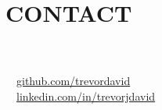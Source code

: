 \section{\large CONTACT}
\faPhone\ \ \textnormal{\myPhone} \\
\faEnvelope\ \ \href{mailto:\myEmail}{\myEmail} \\
\faGithub\ \ \href{https://github.com/trevordavid}{github.com/trevordavid} \\
\faLinkedin\ \ \href{https://www.linkedin.com/in/trevorjdavid}{linkedin.com/in/trevorjdavid}